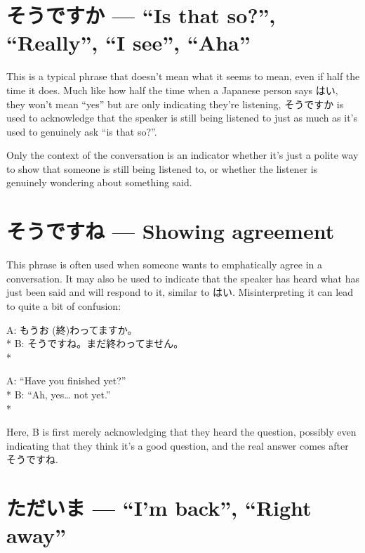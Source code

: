 \documentclass[11pt, b5paper, twoside, openright, onecolumn]{book}
\makeatletter
\newcommand*{\rubystack}[2]{{\relscale{0.5}%
  \begin{tabular}[b]{@{}c@{}}%
    {#1}\\%
   {\textscale{2}{#2}}%
  \end{tabular}}%
}
\DeclareRobustCommand*{\ruby}[2]{%
  \mbox{%
    \setlength{\parskip}{0ex}%
    \BeginAccSupp{method=pdfstringdef,ActualText={#1}}%
      \rubystack{\phantom{#2}}{#1}%
      \llap{%
        \rubystack{#2}{\phantom{#1}}%
      }%
    \EndAccSupp{}%
  }%
}
\renewcommand*{\ruby}[2]{#2 (#1)}%
\newenvironment{exampleblock}{
\setlength{\parindent}{0.6in}
\begin{minipage}[t]{\dimexpr\textwidth-\parindent}}
{\end{minipage}}
\makeatother
\begin{document}
\section*{そうですか — “Is that so?”‚ “Really”‚ “I see”‚ “Aha”}


This is a typical phrase that doesn’t mean what it seems to mean‚ even if half the time it does. Much like how half the time when a Japanese person says はい‚ they won’t mean “yes” but are only indicating they’re listening‚ そうですか is used to acknowledge that the speaker is still being listened to just as much as it’s used to genuinely ask “is that so?”.

Only the context of the conversation is an indicator whether it’s just a polite way to show that someone is still being listened to‚ or whether the listener is genuinely wondering about something said.

\section*{そうですね — Showing agreement}

This phrase is often used when someone wants to emphatically agree in a conversation. It may also be used to indicate that the speaker has heard what has just been said and will respond to it‚ similar to はい. Misinterpreting it can lead to quite a bit of confusion:

\vspace{0.4cm}
\begin{exampleblock}
A: もう\ruby{終}{お}わってますか。 \\* 
B: そうですね。まだ終わってません。 \\* 
\end{exampleblock}
\vspace{0.2cm}

\begin{exampleblock}
A: “Have you finished yet?” \\* 
B: “Ah‚ yes… not yet.” \\* 
\end{exampleblock}
\vspace{0.2cm}

Here‚ B is first merely acknowledging that they heard the question‚ possibly even indicating that they think it’s a good question‚ and the real answer comes after そうですね.

\section*{ただいま  — “I’m back”‚ “Right away”}
\end{document}
